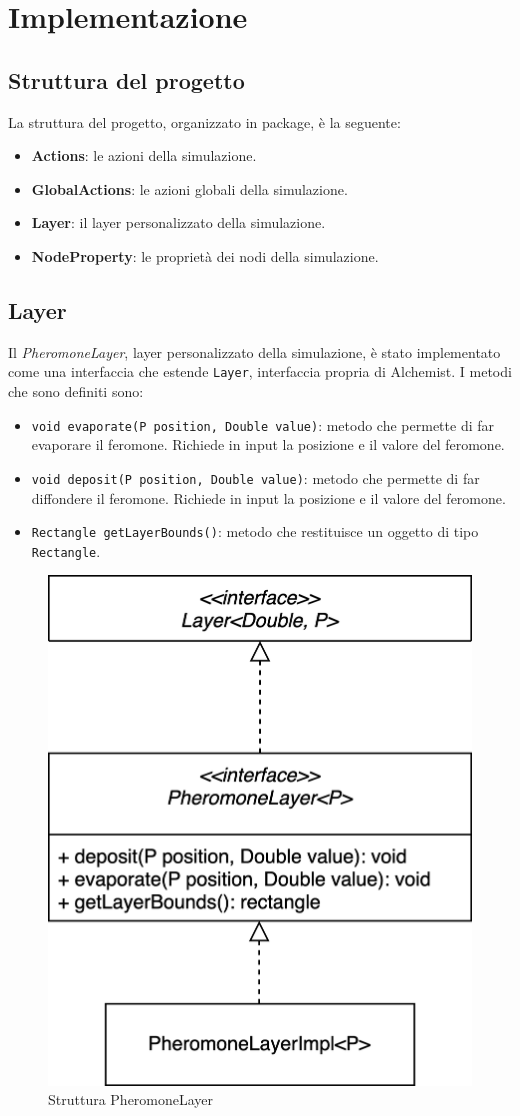 \chapter{Implementazione}
\section{Struttura del progetto}
La struttura del progetto, organizzato in package, è la seguente:
\begin{itemize}
    \item \textbf{Actions}: le azioni della simulazione.
    \item \textbf{GlobalActions}: le azioni globali della simulazione.
    \item \textbf{Layer}: il layer personalizzato della simulazione.
    \item \textbf{NodeProperty}: le proprietà dei nodi della simulazione.
\end{itemize}

\section{Layer}
Il \textit{PheromoneLayer}, layer personalizzato della simulazione, è stato implementato come una interfaccia che estende \texttt{Layer}, 
interfaccia propria di Alchemist.  I metodi che sono definiti sono:
\begin{itemize}
    \item \texttt{void evaporate(P position, Double value)}: metodo che permette di far evaporare il feromone. 
    Richiede in input la posizione e il valore del feromone.
    \item \texttt{void deposit(P position, Double value)}: metodo che permette di far diffondere il feromone.
     Richiede in input la posizione e il valore del feromone.
    \item \texttt{Rectangle getLayerBounds()}: metodo che restituisce un oggetto di tipo \texttt{Rectangle}.
\end{itemize}

\begin{figure}[ht]
    \centering
    \includegraphics[width=.5\linewidth]{figures/pheromoneLayer.png}
    \caption{Struttura PheromoneLayer}\label{fig:phLayer}
\end{figure}

